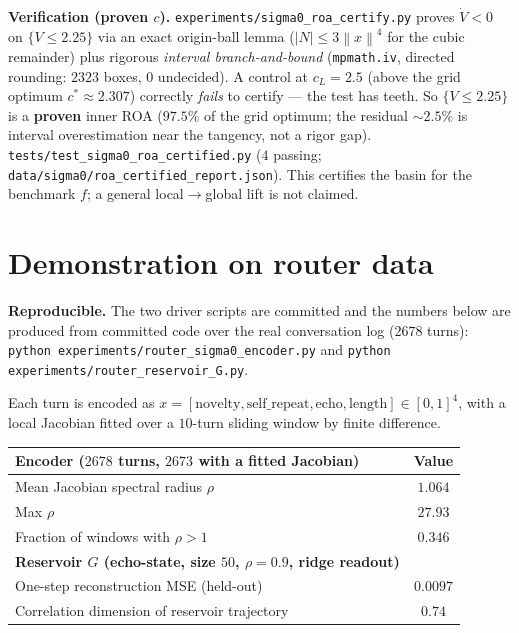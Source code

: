 \documentclass[11pt]{article}
\theoremstyle{definition}
\newcommand{\norm}[1]{\left\lVert#1\right\rVert}
\begin{document}
\begin{verifybox}
\textbf{Verification (proven $c$).} \texttt{experiments/\allowbreak sigma0\_\allowbreak roa\_\allowbreak certify.py}
proves $\dot V<0$ on $\{V\le2.25\}$ via an exact origin-ball lemma ($|N|\le3\norm{x}^4$ for
the cubic remainder) plus rigorous \emph{interval branch-and-bound} (\texttt{mpmath.iv},
directed rounding: $2323$ boxes, $0$ undecided). A control at $c_L=2.5$ (above the grid
optimum $c^\ast\approx2.307$) correctly \emph{fails} to certify --- the test has teeth. So
$\{V\le2.25\}$ is a \textbf{proven} inner ROA ($97.5\%$ of the grid optimum; the residual
$\sim2.5\%$ is interval overestimation near the tangency, not a rigor gap).
\texttt{tests/\allowbreak test\_sigma0\_\allowbreak roa\_\allowbreak certified.py} ($4$ passing;
\texttt{data/sigma0/\allowbreak roa\_\allowbreak certified\_\allowbreak report.json}). This certifies the
basin for the benchmark $f$; a general local$\to$global lift is not claimed.
\end{verifybox}

\section{Demonstration on router data}
\label{sec:demo}
\begin{verifybox}
\textbf{Reproducible.} The two driver scripts are committed and the numbers below are
produced from committed code over the real conversation log ($2678$ turns):
\texttt{python experiments/\allowbreak router\_sigma0\_encoder.py} and
\texttt{python experiments/\allowbreak router\_reservoir\_G.py}.
\end{verifybox}
Each turn is encoded as $x=[\text{novelty},\text{self\_repeat},\text{echo},\text{length}]
\in[0,1]^4$, with a local Jacobian fitted over a $10$-turn sliding window by finite
difference.

\begin{center}
\renewcommand{\arraystretch}{1.2}
\begin{tabular}{@{}lc@{}}
\toprule
\textbf{Encoder ($2678$ turns, $2673$ with a fitted Jacobian)} & Value \\
\midrule
Mean Jacobian spectral radius $\rho$ & $1.064$ \\
Max $\rho$ & $27.93$ \\
Fraction of windows with $\rho>1$ & $0.346$ \\
\midrule
\textbf{Reservoir $G$ (echo-state, size $50$, $\rho=0.9$, ridge readout)} & \\
One-step reconstruction MSE (held-out) & $0.0097$ \\
Correlation dimension of reservoir trajectory & $0.74$ \\
\bottomrule
\end{tabular}
\end{center}
\end{document}
